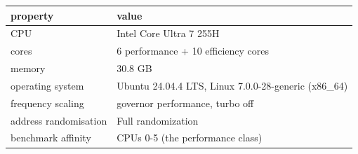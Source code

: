 \begin{tabular}{ll}
\toprule
property & value \\
\midrule
CPU & Intel Core Ultra 7 255H \\
cores & 6 performance + 10 efficiency cores \\
memory & 30.8 GB \\
operating system & Ubuntu 24.04.4 LTS, Linux 7.0.0-28-generic (x86\_64) \\
frequency scaling & governor performance, turbo off \\
address randomisation & Full randomization \\
benchmark affinity & CPUs 0-5 (the performance class) \\
\bottomrule
\end{tabular}
